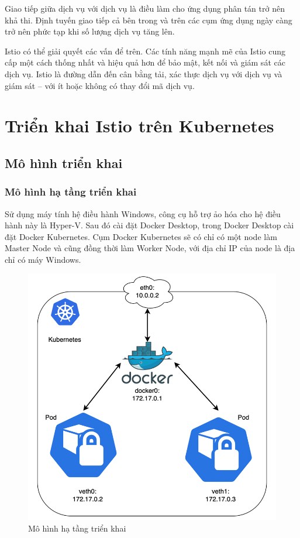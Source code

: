 \documentclass[14pt,a4paper]{book}
\begin{document}
{{		Giao tiếp giữa dịch vụ với dịch vụ là điều làm cho ứng dụng phân tán trở nên khả thi. Định tuyến giao tiếp cả bên trong và trên các cụm ứng dụng ngày càng trở nên phức tạp khi số lượng dịch vụ tăng lên.
		
		Istio có thể giải quyết các vấn để trên. Các tính năng mạnh mẽ của Istio cung cấp một cách thống nhất và hiệu quả hơn để bảo mật, kết nối và giám sát các dịch vụ. Istio là đường dẫn đến cân bằng tải, xác thực dịch vụ với dịch vụ và giám sát – với ít hoặc không có thay đổi mã dịch vụ.
		
\chapter{Triển khai Istio trên Kubernetes}
	\section{Mô hình triển khai}
	\subsection{Mô hình hạ tầng triển khai}
	Sử dụng máy tính hệ điều hành Windows, công cụ hỗ trợ ảo hóa cho hệ điều hành này là Hyper-V. Sau đó cài đặt Docker Desktop, trong Docker Desktop  cài đặt Docker Kubernetes. Cụm Docker Kubernetes sẽ có chỉ có một node làm Master Node và cũng đồng thời làm Worker Node, với địa chỉ IP của node là địa chỉ có máy Windows.
	
	\begin{figure}[h]
		\centering
		\includegraphics[width=0.7\linewidth]{Pics/3.1.1-1}
		\caption{Mô hình hạ tầng triển khai}
		\label{fig:3.1.1-1}
	\end{figure}
	\newpage
}}
\end{document}
